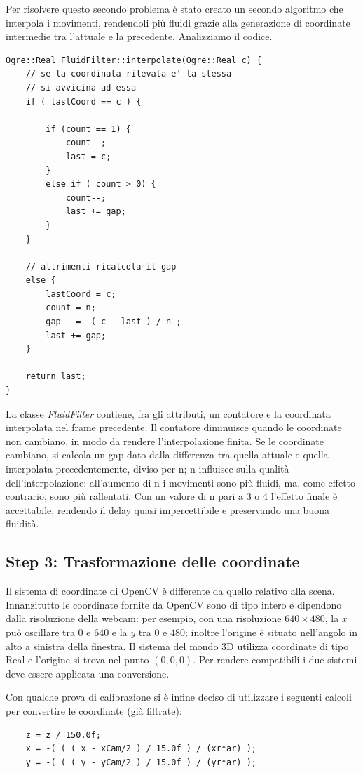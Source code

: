 Per risolvere questo secondo problema è stato creato un secondo algoritmo che interpola i movimenti, rendendoli più fluidi grazie alla generazione di coordinate intermedie tra l'attuale e la precedente. Analizziamo il codice.
\begin{lstlisting}
Ogre::Real FluidFilter::interpolate(Ogre::Real c) {
    // se la coordinata rilevata e' la stessa
    // si avvicina ad essa
    if ( lastCoord == c ) {

        if (count == 1) {
            count--;
            last = c;
        }
        else if ( count > 0) {
            count--;
            last += gap;
        }
    }
    
    // altrimenti ricalcola il gap
    else {
        lastCoord = c;
        count = n;
        gap   =  ( c - last ) / n ;
        last += gap;
    }
    
    return last;
}
\end{lstlisting} 
La classe \textit{FluidFilter} contiene, fra gli attributi, un contatore e la coordinata interpolata nel frame precedente. Il contatore diminuisce quando le coordinate non cambiano, in modo da rendere l'interpolazione finita. Se le coordinate cambiano, si calcola un gap dato dalla differenza tra quella attuale e quella interpolata precedentemente, diviso per n; n influisce sulla qualità dell'interpolazione: all'aumento di n i movimenti sono più fluidi, ma, come effetto contrario, sono più rallentati. Con un valore di n pari a 3 o 4 l'effetto finale è accettabile, rendendo il delay quasi impercettibile e preservando una buona fluidità.

\subsection*{Step 3: Trasformazione delle coordinate}
Il sistema di coordinate di OpenCV è differente da quello relativo alla scena. Innanzitutto le coordinate fornite da OpenCV sono di tipo intero e dipendono dalla risoluzione della webcam: per esempio, con una risoluzione $640\times 480$, la $x$ può oscillare tra $0$ e $640$ e la $y$ tra $0$ e $480$; inoltre l'origine è situato nell'angolo in alto a sinistra della finestra. Il sistema del mondo 3D utilizza coordinate di tipo Real e l'origine si trova nel punto $(0,0,0)$. Per rendere compatibili i due sistemi deve essere applicata una conversione.

Con qualche prova di calibrazione si è infine deciso di utilizzare i seguenti calcoli per convertire le coordinate (già filtrate):
\begin{lstlisting}
    z = z / 150.0f;
    x = -( ( ( x - xCam/2 ) / 15.0f ) / (xr*ar) );
    y = -( ( ( y - yCam/2 ) / 15.0f ) / (yr*ar) );  
\end{lstlisting}  

